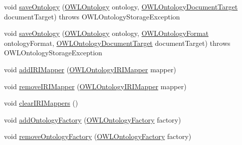 \begin{DoxyCompactItemize}
\item 
void \hyperlink{interfaceorg_1_1semanticweb_1_1owlapi_1_1model_1_1_o_w_l_ontology_manager_ae48340511be6e72a23c7e02f4cf85670}{save\-Ontology} (\hyperlink{interfaceorg_1_1semanticweb_1_1owlapi_1_1model_1_1_o_w_l_ontology}{O\-W\-L\-Ontology} ontology, \hyperlink{interfaceorg_1_1semanticweb_1_1owlapi_1_1io_1_1_o_w_l_ontology_document_target}{O\-W\-L\-Ontology\-Document\-Target} document\-Target)  throws O\-W\-L\-Ontology\-Storage\-Exception
\item 
void \hyperlink{interfaceorg_1_1semanticweb_1_1owlapi_1_1model_1_1_o_w_l_ontology_manager_a7e1631bb6dd8cc5522a845c079d41f5d}{save\-Ontology} (\hyperlink{interfaceorg_1_1semanticweb_1_1owlapi_1_1model_1_1_o_w_l_ontology}{O\-W\-L\-Ontology} ontology, \hyperlink{classorg_1_1semanticweb_1_1owlapi_1_1model_1_1_o_w_l_ontology_format}{O\-W\-L\-Ontology\-Format} ontology\-Format, \hyperlink{interfaceorg_1_1semanticweb_1_1owlapi_1_1io_1_1_o_w_l_ontology_document_target}{O\-W\-L\-Ontology\-Document\-Target} document\-Target)  throws O\-W\-L\-Ontology\-Storage\-Exception
\item 
void \hyperlink{interfaceorg_1_1semanticweb_1_1owlapi_1_1model_1_1_o_w_l_ontology_manager_adc98e49d65b458d555b085a7b0409fe7}{add\-I\-R\-I\-Mapper} (\hyperlink{interfaceorg_1_1semanticweb_1_1owlapi_1_1model_1_1_o_w_l_ontology_i_r_i_mapper}{O\-W\-L\-Ontology\-I\-R\-I\-Mapper} mapper)
\item 
void \hyperlink{interfaceorg_1_1semanticweb_1_1owlapi_1_1model_1_1_o_w_l_ontology_manager_a7793e1dc2e759af2325955ec5611d175}{remove\-I\-R\-I\-Mapper} (\hyperlink{interfaceorg_1_1semanticweb_1_1owlapi_1_1model_1_1_o_w_l_ontology_i_r_i_mapper}{O\-W\-L\-Ontology\-I\-R\-I\-Mapper} mapper)
\item 
void \hyperlink{interfaceorg_1_1semanticweb_1_1owlapi_1_1model_1_1_o_w_l_ontology_manager_a4b8edc4b3c5272ada2dae56597379226}{clear\-I\-R\-I\-Mappers} ()
\item 
void \hyperlink{interfaceorg_1_1semanticweb_1_1owlapi_1_1model_1_1_o_w_l_ontology_manager_a09101952940e0cb7a364c14efb87d2d6}{add\-Ontology\-Factory} (\hyperlink{interfaceorg_1_1semanticweb_1_1owlapi_1_1model_1_1_o_w_l_ontology_factory}{O\-W\-L\-Ontology\-Factory} factory)
\item 
void \hyperlink{interfaceorg_1_1semanticweb_1_1owlapi_1_1model_1_1_o_w_l_ontology_manager_a754cd278f1220d9410d2200a1ddfcd8c}{remove\-Ontology\-Factory} (\hyperlink{interfaceorg_1_1semanticweb_1_1owlapi_1_1model_1_1_o_w_l_ontology_factory}{O\-W\-L\-Ontology\-Factory} factory)

\end{DoxyCompactItemize}
